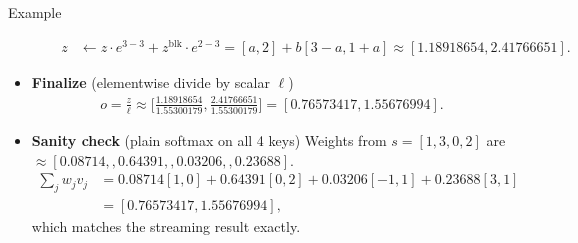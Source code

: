 \begin{commentbox}{Example}
\begin{itemize}
\begin{itemize}
\begin{align*}
				  z &\leftarrow z\cdot e^{3-3} + z^{\text{blk}}\cdot e^{2-3}
				  = [a,2] + b[3-a,1+a] \approx \boxed{[1.18918654,2.41766651]}.
				\end{align*}
		\end{itemize}
	\item \textbf{Finalize} (elementwise divide by scalar $\ell$)
		\begin{align*}
			o=\frac{z}{\ell}
			\approx \Big[\frac{1.18918654}{1.55300179},\frac{2.41766651}{1.55300179}\Big]
			= \boxed{[0.76573417,1.55676994]}.
		\end{align*}
	\item \textbf{Sanity check} (plain softmax on all 4 keys)
		Weights from $s=[1,3,0,2]$ are $\approx[0.08714,,0.64391,,0.03206,,0.23688]$.
		\begin{align*}
			\sum_j w_j v_j
			&= 0.08714[1,0]+0.64391[0,2]+0.03206[-1,1]+0.23688[3,1]\\
			&= [0.76573417,1.55676994],
		\end{align*}
		which matches the streaming result exactly. 
\end{itemize}
\end{commentbox}






